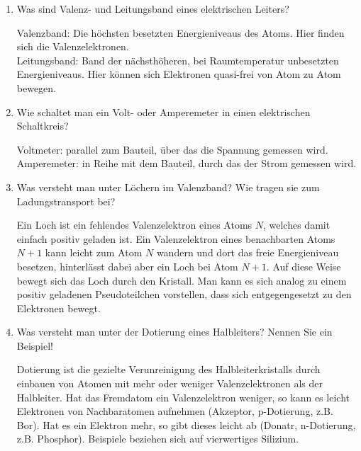 \begin{enumerate}
	\item Was sind Valenz- und Leitungsband eines elektrischen Leiters?
	\begin{solution}
		Valenzband: Die höchsten besetzten Energieniveaus des Atoms. Hier finden sich die Valenzelektronen.\\
		Leitungsband: Band der nächsthöheren, bei Raumtemperatur unbesetzten Energieniveaus. Hier können sich Elektronen quasi-frei von Atom zu Atom bewegen.
	\end{solution}
	\item Wie schaltet man ein Volt- oder Amperemeter in einen elektrischen Schaltkreis?
	\begin{solution}
		Voltmeter: parallel zum Bauteil, über das die Spannung gemessen wird.\\
		Amperemeter: in Reihe mit dem Bauteil, durch das der Strom gemessen wird.
	\end{solution}
	\item Was versteht man unter Löchern im Valenzband? Wie tragen sie zum Ladungstransport bei?
	\begin{solution}
		Ein Loch ist ein fehlendes Valenzelektron eines Atoms $N$, welches damit einfach positiv geladen ist. Ein Valenzelektron eines benachbarten Atoms $N+1$ kann leicht zum Atom $N$ wandern und dort das freie Energieniveau besetzen, hinterlässt dabei aber ein Loch bei Atom $N+1$. Auf diese Weise bewegt sich das Loch durch den Kristall. Man kann es sich analog zu einem positiv geladenen Pseudoteilchen vorstellen, dass sich entgegengesetzt zu den Elektronen bewegt. 
	\end{solution}
	\item Was versteht man unter der Dotierung eines Halbleiters? Nennen Sie ein Beispiel!
	\begin{solution}
		Dotierung ist die gezielte Verunreinigung des Halbleiterkristalls durch einbauen von Atomen mit mehr oder weniger Valenzelektronen als der Halbleiter. Hat das Fremdatom ein Valenzelektron weniger, so kann es leicht Elektronen von Nachbaratomen aufnehmen (Akzeptor, p-Dotierung, z.B. Bor). Hat es ein Elektron mehr, so gibt dieses leicht ab (Donatr, n-Dotierung, z.B. Phosphor). Beispiele beziehen sich auf vierwertiges Silizium.
	\end{solution}

\end{enumerate}

